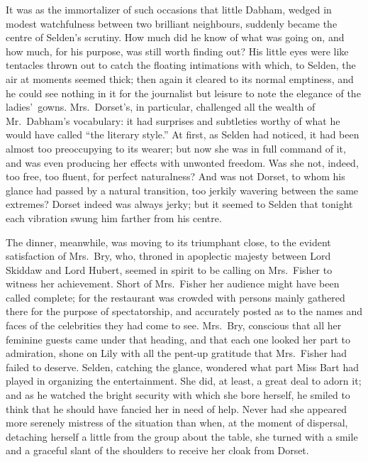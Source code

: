 \documentclass[12pt,a4paper]{book}
\begin{document}
It was as the immortalizer of such occasions that little Dabham,
wedged in modest watchfulness between two brilliant neighbours,
suddenly became the centre of Selden's scrutiny. How much did he
know of what was going on, and how much, for his purpose, was
still worth finding out? His little eyes were like tentacles
thrown out to catch the floating intimations with which, to
Selden, the air at moments seemed thick; then again it cleared to
its normal emptiness, and he could see nothing in it for the
journalist but leisure to note the elegance of the ladies'\ gowns. 
Mrs.\ Dorset's, in particular, challenged all the wealth
of Mr.\ Dabham's vocabulary: it had surprises and subtleties
worthy of what he would have called ``the literary style.'' At
first, as Selden had noticed, it had been almost too preoccupying
to its wearer; but now she was in full command of it, and was
even producing her effects with unwonted freedom. Was she not,
indeed, too free, too fluent, for perfect naturalness? And was
not Dorset, to whom his glance had passed by a natural
transition, too jerkily wavering between the same extremes? 
Dorset indeed was always jerky; but it seemed to Selden that
tonight each vibration swung him farther from his centre.





The dinner, meanwhile, was moving to its triumphant close, to the
evident satisfaction of Mrs.\ Bry, who, throned in apoplectic
majesty between Lord Skiddaw and Lord Hubert, seemed in spirit to
be calling on Mrs.\ Fisher to witness her achievement. Short of
Mrs.\ Fisher her audience might have been called complete; for the
restaurant was crowded with persons mainly gathered there for the
purpose of spectatorship, and accurately posted as to the names
and faces of the celebrities they had come to see. Mrs.\ Bry,
conscious that all her feminine guests came under that heading,
and that each one looked her part to admiration, shone on Lily
with all the pent-up gratitude that Mrs.\ Fisher had failed to
deserve. Selden, catching the glance, wondered what part Miss
Bart had played in organizing the entertainment. She did, at
least, a great deal to adorn it; and as he watched the bright
security with which she bore herself, he smiled to think that he
should have fancied her in need of help. Never had she appeared
more serenely mistress of the situation than when, at the moment
of dispersal, detaching herself a little from the group about the
table, she turned with a smile and a graceful slant of the
shoulders to receive her cloak from Dorset.
\end{document}
